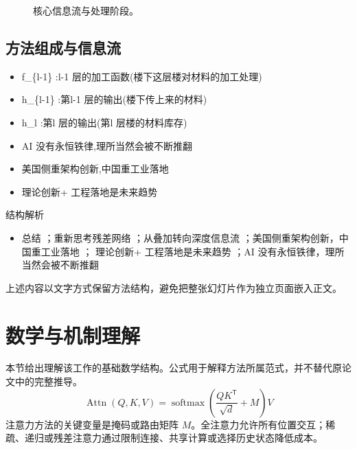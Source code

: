 \documentclass[UTF8,11pt,a4paper]{ctexart}
\begin{document}
\begin{figure}[H]
\centering
{}
\caption{核心信息流与处理阶段。}
\end{figure}

\subsection{方法组成与信息流}
\begin{itemize}
\item f\_\{l-1\} :l-1 层的加工函数(楼下这层楼对材料的加工处理)
\item h\_\{l-1\} :第l-1 层的输出(楼下传上来的材料)
\item h\_l :第l 层的输出(第l 层楼的材料库存)
\item AI 没有永恒铁律,理所当然会被不断推翻
\item 美国侧重架构创新,中国重工业落地
\item 理论创新+ 工程落地是未来趋势
\end{itemize}

\begin{keybox}{结构解析}
\begin{itemize}
\item 总结 ；重新思考残差网络 ；从叠加转向深度信息流 ；美国侧重架构创新，中国重工业落地 ； 理论创新+ 工程落地是未来趋势 ；AI 没有永恒铁律，理所当然会被不断推翻
\end{itemize}
\end{keybox}

上述内容以文字方式保留方法结构，避免把整张幻灯片作为独立页面嵌入正文。

\section{数学与机制理解}
本节给出理解该工作的基础数学结构。公式用于解释方法所属范式，并不替代原论文中的完整推导。
\begin{equation}
\operatorname{Attn}(Q,K,V)=\operatorname{softmax}\!\left(\frac{QK^{\mathsf T}}{\sqrt d}+M\right)V
\end{equation}
注意力方法的关键变量是掩码或路由矩阵 $M$。全注意力允许所有位置交互；稀疏、递归或残差注意力通过限制连接、共享计算或选择历史状态降低成本。
\end{document}
